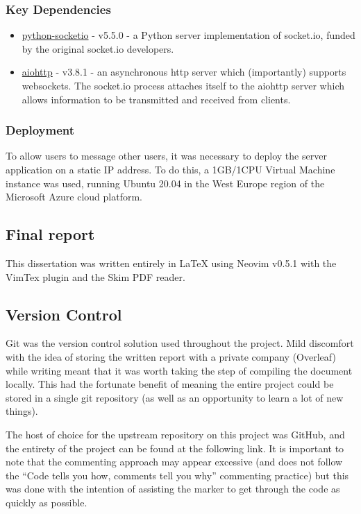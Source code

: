 \documentclass{mproj}
\begin{document}
\subsubsection{Key Dependencies}
\begin{itemize}
	\item \href{https://python-socketio.readthedocs.io/en/latest/index.html}{python-socketio} - v5.5.0 - a Python server implementation of socket.io, funded by the original socket.io developers.
	\item \href{https://docs.aiohttp.org/en/stable/}{aiohttp} - v3.8.1 - an asynchronous http server which (importantly) supports websockets. The socket.io process attaches itself to the aiohttp server which allows information to be transmitted and received from clients.
\end{itemize}

\subsubsection{Deployment}
To allow users to message other users, it was necessary to deploy the server application on a static IP address. To do this, a 1GB/1CPU Virtual Machine instance was used, running Ubuntu 20.04 in the West Europe region of the Microsoft Azure cloud platform. 

\subsection{Final report}
This dissertation was written entirely in LaTeX using Neovim v0.5.1 with the VimTex plugin and the Skim PDF reader. 

\subsection{Version Control}
Git was the version control solution used throughout the project. Mild discomfort with the idea of storing the written report with a private company (Overleaf) while writing meant that it was worth taking the step of compiling the document locally. This had the fortunate benefit of meaning the entire project could be stored in a single git repository (as well as an opportunity to learn a lot of new things). 

The host of choice for the upstream repository on this project was GitHub, and the entirety of the project can be found at the following link. It is important to note that the commenting approach may appear excessive (and does not follow the ``Code tells you how, comments tell you why'' commenting practice) but this was done with the intention of assisting the marker to get through the code as quickly as possible.  
\end{document}

